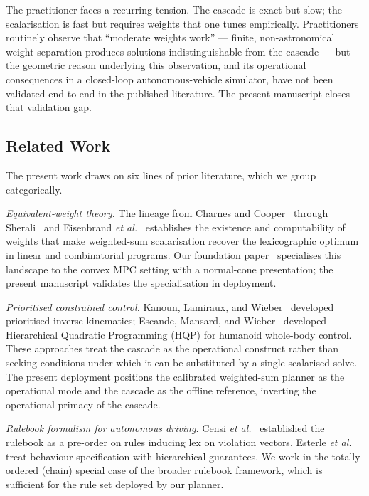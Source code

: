 The practitioner faces a recurring tension. The cascade is exact but slow; the scalarisation is fast but requires weights that one tunes empirically. Practitioners routinely observe that ``moderate weights work'' --- finite, non-astronomical weight separation produces solutions indistinguishable from the cascade --- but the geometric reason underlying this observation, and its operational consequences in a closed-loop autonomous-vehicle simulator, have not been validated end-to-end in the published literature. The present manuscript closes that validation gap.

\subsection{Related Work}
\label{sec:intro:related}

The present work draws on six lines of prior literature, which we group categorically.

\emph{Equivalent-weight theory.} The lineage from Charnes and Cooper~\cite{charnes1961goal} through Sherali~\cite{sherali1982equivalent} and Eisenbrand \emph{et al.}~\cite{eisenbrand2003lex} establishes the existence and computability of weights that make weighted-sum scalarisation recover the lexicographic optimum in linear and combinatorial programs. Our foundation paper~\cite{lcp2025} specialises this landscape to the convex MPC setting with a normal-cone presentation; the present manuscript validates the specialisation in deployment.

\emph{Prioritised constrained control.} Kanoun, Lamiraux, and Wieber~\cite{kanoun2011prioritized} developed prioritised inverse kinematics; Escande, Mansard, and Wieber~\cite{escande2014hqp} developed Hierarchical Quadratic Programming (HQP) for humanoid whole-body control. These approaches treat the cascade as the operational construct rather than seeking conditions under which it can be substituted by a single scalarised solve. The present deployment positions the calibrated weighted-sum planner as the operational mode and the cascade as the offline reference, inverting the operational primacy of the cascade.

\emph{Rulebook formalism for autonomous driving.} Censi \emph{et al.}~\cite{censi2019liability} established the rulebook as a pre-order on rules inducing lex on violation vectors. Esterle \emph{et al.}~\cite{esterle2020specification} treat behaviour specification with hierarchical guarantees. We work in the totally-ordered (chain) special case of the broader rulebook framework, which is sufficient for the rule set deployed by our planner.

